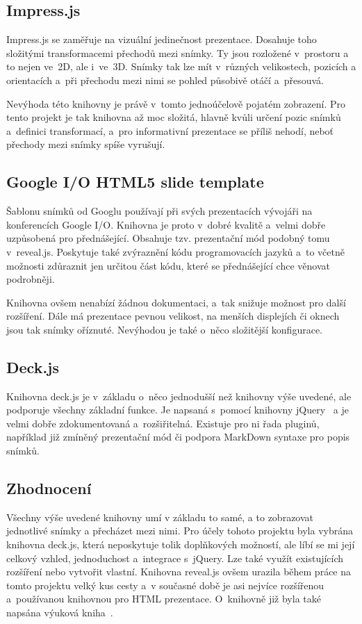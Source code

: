 \documentclass[11pt,twoside,a4paper]{book}
\begin{document}
\subsection{Impress.js}
Impress.js \cite{impressjs} se zaměřuje na vizuální jedinečnost prezentace. Dosahuje toho složitými transformacemi přechodů mezi snímky. Ty jsou rozložené v~prostoru a to nejen ve~2D, ale i~ve~3D. Snímky tak lze mít v~různých velikostech, pozicích a orientacích a~při přechodu mezi nimi se pohled působivě otáčí a~přesouvá.

Nevýhoda této knihovny je právě v~tomto jednoúčelově pojatém zobrazení. Pro tento projekt je tak knihovna až moc složitá, hlavně kvůli určení pozic snímků a~definici transformací, a~pro informativní prezentace se příliš nehodí, neboť přechody mezi snímky spíše vyrušují.

\subsection{Google I/O HTML5 slide template}
Šablonu snímků od Googlu \cite{googletemplate} používají při svých prezentacích vývojáři na konferencích Google I/O. Knihovna je proto v~dobré kvalitě a~velmi dobře uzpůsobená pro přednášející. Obsahuje tzv. prezentační mód podobný tomu v~reveal.js. Poskytuje také zvýraznění kódu programovacích jazyků a~to včetně možnosti zdůraznit jen určitou část kódu, které se přednášející chce věnovat podrobněji.

Knihovna ovšem nenabízí žádnou dokumentaci, a~tak snižuje možnost pro další rozšíření. Dále má prezentace pevnou velikost, na menších displejích či oknech jsou tak snímky oříznuté. Nevýhodou je také o~něco složitější konfigurace.

\subsection{Deck.js}
Knihovna deck.js \cite{deckjs} je v~základu o~něco jednodušší než knihovny výše uvedené, ale podporuje všechny základní funkce. Je napsaná s~pomocí knihovny jQuery~\cite{jQuery} a je velmi dobře zdokumentovaná a~rozšiřitelná. Existuje pro ni řada pluginů, například již zmíněný prezentační mód či podpora Mark\-Down syntaxe pro popis snímků.

\subsection{Zhodnocení}
Všechny výše uvedené knihovny umí v základu to samé, a to zobrazovat jednotlivé snímky a přecházet mezi nimi. Pro účely tohoto projektu byla vybrána knihovna deck.js, která neposkytuje tolik doplňkových možností, ale líbí se mi její celkový vzhled, jednoduchost a~integrace s~jQuery. Lze také využít existujících rozšíření nebo vytvořit vlastní. Knihovna reveal.js ovšem urazila během práce na tomto projektu velký kus cesty a~v současné době je asi nejvíce rozšířenou a~používanou knihovnou pro HTML prezentace. O~knihovně již byla také napsána výuková kniha~\cite{howtobook}.
\end{document}
